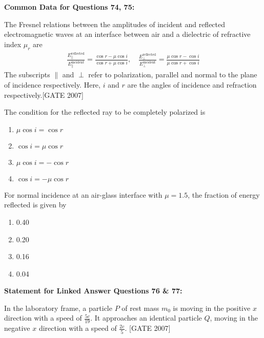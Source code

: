 \textbf{Common Data for Questions 74, 75:}

The Fresnel relations between the amplitudes of incident and reflected electromagnetic waves at an interface between air and a dielectric of refractive index $\mu_r$ are   
\begin{align*}
    \frac{E_{\parallel}^{\text{reflected}}}{E_{\parallel}^{\text{incident}}} = \frac{\cos r - \mu \cos i}{\cos r + \mu \cos i}, \quad \frac{E_{\perp}^{\text{reflected}}}{E_{\perp}^{\text{incident}}} = \frac{\mu \cos r - \cos i}{\mu \cos r + \cos i}
\end{align*}
The subscripts $\parallel$ and $\perp$ refer to polarization, parallel and normal to the plane of incidence respectively. Here, $i$ and $r$ are the angles of incidence and refraction respectively.\hfill{[GATE 2007]}


    \item  The condition for the reflected ray to be completely polarized is
    \begin{multicols}{2}
    \begin{enumerate}
        \item $\mu \cos i = \cos r$
        \item $\cos i = \mu \cos r$
        \item $\mu \cos i = - \cos r$
        \item $\cos i = - \mu \cos r$
    \end{enumerate}
    \end{multicols}

    \item  For normal incidence at an air-glass interface with $\mu = 1.5$, the fraction of energy reflected is given by
    \begin{multicols}{4}
    \begin{enumerate}
        \item 0.40
        \item 0.20
        \item 0.16
        \item 0.04
    \end{enumerate}
    \end{multicols}



\textbf{Statement for Linked Answer Questions 76 \& 77:}

In the laboratory frame, a particle $P$ of rest mass $m_0$ is moving in the positive $x$ direction with a speed of $\frac{5c}{19}$. It approaches an identical particle $Q$, moving in the negative $x$ direction with a speed of $\frac{2c}{5}$.  \hfill{[GATE 2007]}


